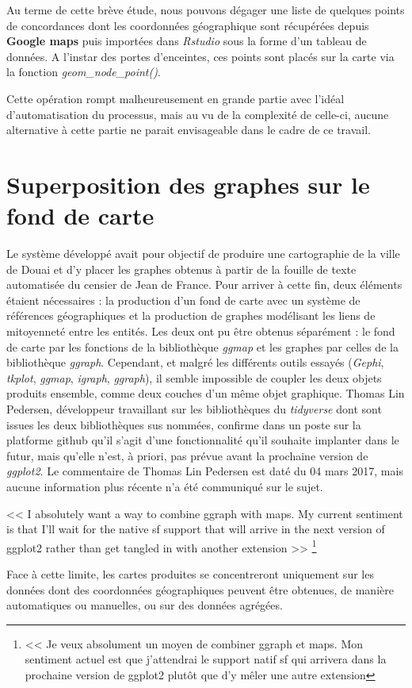 Au terme de cette brève étude, nous pouvons dégager une liste de quelques points de concordances dont les coordonnées géographique sont récupérées depuis \textbf{Google maps} puis importées dans \textit{Rstudio} sous la forme d'un tableau de données. A l'instar des portes d'enceintes, ces points sont placés sur la carte via la fonction \textit{geom\_node\_point()}.

Cette opération rompt malheureusement en grande partie avec l'idéal d'automatisation du processus, mais au vu de la complexité de celle-ci, aucune alternative à cette partie ne parait envisageable dans le cadre de ce travail.

\section{Superposition des graphes sur le fond de carte}
Le système développé avait pour objectif de produire une cartographie de la ville de Douai et d'y placer les graphes obtenus à partir de la fouille de texte automatisée du censier de Jean de France. Pour arriver à cette fin, deux éléments étaient nécessaires : la production d'un fond de carte avec un système de références géographiques et la production de graphes modélisant les liens de mitoyenneté entre les entités. Les deux ont pu être obtenus séparément : le fond de carte par les fonctions de la bibliothèque \textit{ggmap} et les graphes par celles de la bibliothèque \textit{ggraph}. Cependant, et malgré les différents outils essayés (\textit{Gephi}, \textit{tkplot}, \textit{ggmap}, \textit{igraph}, \textit{ggraph}), il semble impossible de coupler les deux objets produits ensemble, comme deux couches d'un même objet graphique. Thomas Lin Pedersen, développeur travaillant sur les bibliothèques du \textit{tidyverse} dont sont issues les deux bibliothèques sus nommées, confirme dans un poste sur la platforme github qu'il s'agit d'une fonctionnalité qu'il souhaite implanter dans le futur, mais qu'elle n'est, à priori, pas prévue avant la prochaine version de \textit{ggplot2}. Le commentaire de Thomas Lin Pedersen est daté du 04 mars 2017, mais aucune information plus récente n'a été communiqué sur le sujet.

\begin{displayquote}
    << I absolutely want a way to combine ggraph with maps. My current sentiment is that I'll wait for the native sf support that will arrive in the next version of ggplot2 rather than get tangled in with another extension >> 
     \footnote{ << Je veux absolument un moyen de combiner ggraph et maps. Mon sentiment actuel est que j'attendrai le support natif sf qui arrivera dans la prochaine version de ggplot2 plutôt que d'y mêler une autre extension}
\end{displayquote} 
\vspace{0,5cm}
Face à cette limite, les cartes produites se concentreront uniquement sur les données dont des coordonnées géographiques peuvent être obtenues, de manière automatiques ou manuelles, ou sur des données agrégées.

